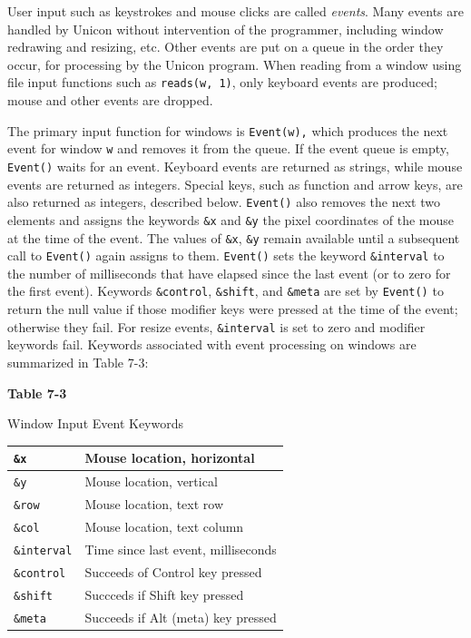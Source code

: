 User input such as keystrokes and mouse clicks are called
\textit{events}. Many events are handled by Unicon without intervention
of the programmer, including window redrawing and resizing, etc.
Other events are put on a queue in the order they occur, for
processing by the Unicon program. When reading from a window using file
input functions such as \texttt{reads(w, 1)}, only keyboard events are
produced; mouse and other events are dropped.

The primary input function for windows is \texttt{Event(w),} which
produces the next event for window \texttt{w} and removes it from the
queue. If the event queue is empty, \texttt{Event()} waits for an
event. Keyboard events are returned as strings, while mouse events are
returned as integers. Special keys, such as function and arrow keys,
are also returned as integers, described below. \texttt{Event()} also
removes the next two elements and assigns the keywords \texttt{\&x} and
\texttt{\&y} the pixel coordinates of the mouse at the time of the
event. The values of \texttt{\&x}, \texttt{\&y} remain available until
a subsequent call to \texttt{Event()} again assigns to them.
\texttt{Event()} sets the keyword \texttt{\&interval} to the number of
milliseconds that have elapsed since the last event (or to zero for the
first event). Keywords \texttt{\&control}, \texttt{\&shift}, and
\texttt{\&meta} are set by \texttt{Event()} to return the null value if
those modifier keys were pressed at the time of the event; otherwise
they fail. For resize events, \texttt{\&interval} is set to zero and
modifier keywords fail. Keywords associated with event processing on
windows are summarized in Table 7-3:

{\centering\sffamily\bfseries
Table 7-3

Window Input Event Keywords
}

\begin{center}
\begin{supertabular}{|m{0.91775984in}|m{2.3525598in}|}
\texttt{\&x} &
Mouse location, horizontal\\\hline
\texttt{\&y} &
Mouse location, vertical\\\hline
\texttt{\&row} &
Mouse location, text row\\\hline
\texttt{\&col} &
Mouse location, text column\\\hline
\texttt{\&interval} &
Time since last event, milliseconds\\\hline
\texttt{\&control} &
Succeeds of Control key pressed\\\hline
\texttt{\&shift} &
Succceds if Shift key pressed\\\hline
\texttt{\&meta} &
Succeeds if Alt (meta) key pressed\\\hline
\end{supertabular}
\end{center}
